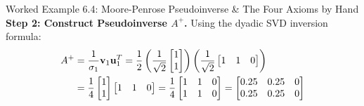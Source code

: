 \begin{examplebox}[breakable]{Worked Example 6.4: Moore-Penrose Pseudoinverse \& The Four Axioms by Hand}
\textbf{Step 2: Construct Pseudoinverse $A^+$.}
Using the dyadic SVD inversion formula:
\begin{align}
A^+ &= \frac{1}{\sigma_1} \mathbf{v}_1 \mathbf{u}_1^T = \frac{1}{2} \left( \frac{1}{\sqrt{2}}\begin{bmatrix} 1 \\ 1 \end{bmatrix} \right) \left( \frac{1}{\sqrt{2}}\begin{bmatrix} 1 & 1 & 0 \end{bmatrix} \right) \notag \\
&= \frac{1}{4} \begin{bmatrix} 1 \\ 1 \end{bmatrix} \begin{bmatrix} 1 & 1 & 0 \end{bmatrix} = \frac{1}{4} \begin{bmatrix} 1 & 1 & 0 \\ 1 & 1 & 0 \end{bmatrix} = \begin{bmatrix} 0.25 & 0.25 & 0 \\ 0.25 & 0.25 & 0 \end{bmatrix}
\end{align}


\end{examplebox}
